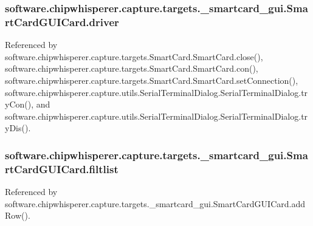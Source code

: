 \subsubsection[{driver}]{\setlength{\rightskip}{0pt plus 5cm}software.\+chipwhisperer.\+capture.\+targets.\+\_\+smartcard\+\_\+gui.\+Smart\+Card\+G\+U\+I\+Card.\+driver}\label{classsoftware_1_1chipwhisperer_1_1capture_1_1targets_1_1__smartcard__gui_1_1SmartCardGUICard_a209baa4e11b395022eb1e803013591c4}


Referenced by software.\+chipwhisperer.\+capture.\+targets.\+Smart\+Card.\+Smart\+Card.\+close(), software.\+chipwhisperer.\+capture.\+targets.\+Smart\+Card.\+Smart\+Card.\+con(), software.\+chipwhisperer.\+capture.\+targets.\+Smart\+Card.\+Smart\+Card.\+set\+Connection(), software.\+chipwhisperer.\+capture.\+utils.\+Serial\+Terminal\+Dialog.\+Serial\+Terminal\+Dialog.\+try\+Con(), and software.\+chipwhisperer.\+capture.\+utils.\+Serial\+Terminal\+Dialog.\+Serial\+Terminal\+Dialog.\+try\+Dis().

\hypertarget{classsoftware_1_1chipwhisperer_1_1capture_1_1targets_1_1__smartcard__gui_1_1SmartCardGUICard_a66117a90b2caaf1a0cdcc6026bfc414e}{}
\subsubsection[{filtlist}]{\setlength{\rightskip}{0pt plus 5cm}software.\+chipwhisperer.\+capture.\+targets.\+\_\+smartcard\+\_\+gui.\+Smart\+Card\+G\+U\+I\+Card.\+filtlist}\label{classsoftware_1_1chipwhisperer_1_1capture_1_1targets_1_1__smartcard__gui_1_1SmartCardGUICard_a66117a90b2caaf1a0cdcc6026bfc414e}


Referenced by software.\+chipwhisperer.\+capture.\+targets.\+\_\+smartcard\+\_\+gui.\+Smart\+Card\+G\+U\+I\+Card.\+add\+Row().

\hypertarget{classsoftware_1_1chipwhisperer_1_1capture_1_1targets_1_1__smartcard__gui_1_1SmartCardGUICard_a38289fa3967d2704d23c215623b9be3a}{}
